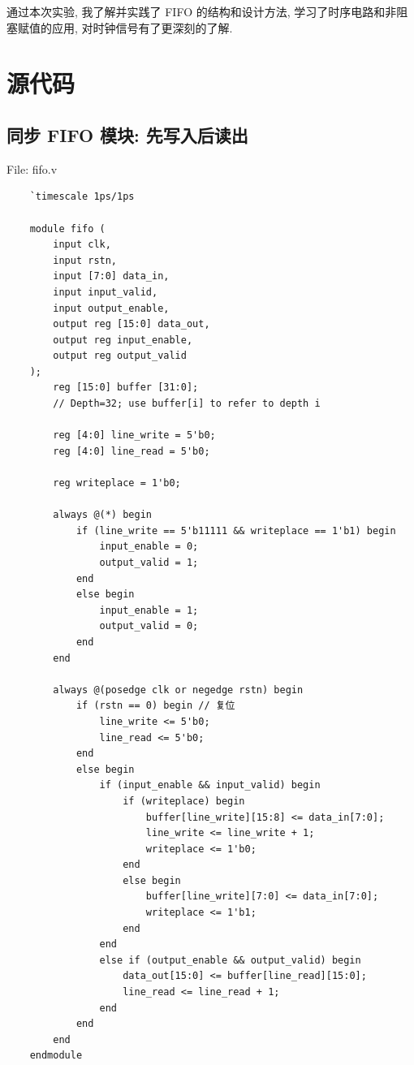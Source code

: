 \documentclass{article}
\begin{document}
通过本次实验, 我了解并实践了 FIFO 的结构和设计方法, 学习了时序电路和非阻塞赋值的应用, 对时钟信号有了更深刻的了解.

\section{源代码}

\subsection{同步 FIFO 模块: 先写入后读出}

File: fifo.v
\begin{lstlisting}
    `timescale 1ps/1ps

    module fifo (
        input clk,
        input rstn,
        input [7:0] data_in,
        input input_valid,
        input output_enable,
        output reg [15:0] data_out,
        output reg input_enable,
        output reg output_valid
    );
        reg [15:0] buffer [31:0];
        // Depth=32; use buffer[i] to refer to depth i

        reg [4:0] line_write = 5'b0;
        reg [4:0] line_read = 5'b0;

        reg writeplace = 1'b0;

        always @(*) begin
            if (line_write == 5'b11111 && writeplace == 1'b1) begin
                input_enable = 0;
                output_valid = 1;
            end
            else begin
                input_enable = 1;
                output_valid = 0;
            end
        end

        always @(posedge clk or negedge rstn) begin
            if (rstn == 0) begin // 复位
                line_write <= 5'b0;
                line_read <= 5'b0;
            end
            else begin
                if (input_enable && input_valid) begin
                    if (writeplace) begin
                        buffer[line_write][15:8] <= data_in[7:0];
                        line_write <= line_write + 1;
                        writeplace <= 1'b0;
                    end
                    else begin
                        buffer[line_write][7:0] <= data_in[7:0];
                        writeplace <= 1'b1;
                    end
                end
                else if (output_enable && output_valid) begin
                    data_out[15:0] <= buffer[line_read][15:0];
                    line_read <= line_read + 1;
                end
            end
        end
    endmodule
\end{lstlisting}
\end{document}
